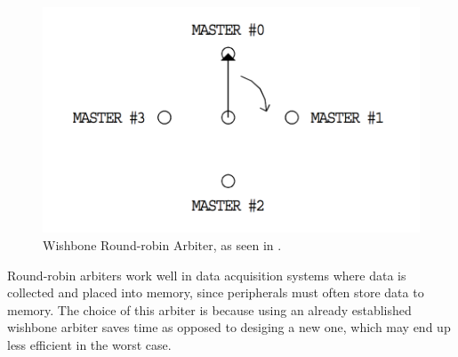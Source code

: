 %
%
\begin{figure}[htb]
    \centering
    \includegraphics[width=1.0\textwidth]{Figures/Tile/WBArbiter}
    \caption{Wishbone Round-robin Arbiter, as seen in \cite{WBLibrary}.}
    \label{fig:WBArbiter}
\end{figure}

Round-robin arbiters work well in data acquisition systems where data is collected and placed into memory, since peripherals must often store data to memory.
The choice of this arbiter is because using an already established wishbone arbiter saves time as opposed to desiging a new one, which may end up less efficient in the worst case.


